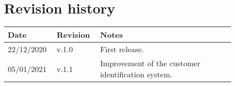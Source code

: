 \chapter*{Revision history}

\begin{center}
	\begin{tabular}{@{}p{0.18\linewidth} p{0.18\linewidth} p{0.57\linewidth}@{}}
		\toprule
		\textbf{Date} & \textbf{Revision} & \textbf{Notes}\\
		\midrule
		22/12/2020 & v.1.0 & First release.\\
		05/01/2021 & v.1.1 & Improvement of the customer identification system.\\
		\bottomrule
	\end{tabular}
\end{center}